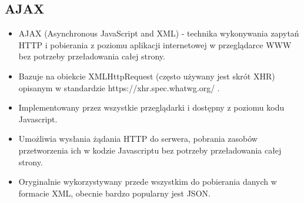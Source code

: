 \documentclass[../main.tex]{subfiles}
\begin{document}
    \subsection{AJAX}
    \begin{itemize}
        \item AJAX (Asynchronous JavaScript and XML) - technika wykonywania zapytań
        HTTP i pobierania z poziomu aplikacji internetowej w przeglądarce WWW bez
        potrzeby przeładowania całej strony.
        \item Bazuje na obiekcie XMLHttpRequest (często używany jest skrót XHR) opisanym
        w standardzie https://xhr.spec.whatwg.org/ .
        \item Implementowany przez wszystkie przeglądarki i dostępny z poziomu kodu
        Javascript.
        \item Umożliwia wysłania żądania HTTP do serwera, pobrania zasobów
        przetworzenia ich w kodzie Javascriptu bez potrzeby przeładowania całej
        strony.
        \item Oryginalnie wykorzystywany przede wszystkim do pobierania danych w
        formacie XML, obecnie bardzo popularny jest JSON.
    \end{itemize}
\end{document}
